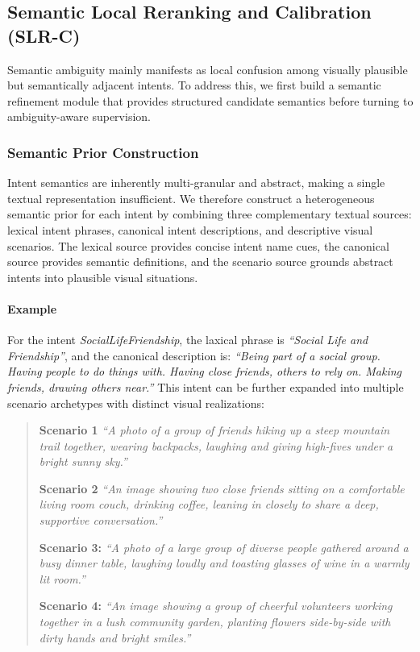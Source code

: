 \subsection{Semantic Local Reranking and Calibration (SLR-C)}

Semantic ambiguity mainly manifests as local confusion among visually plausible but semantically adjacent intents. To address this, we first build a semantic refinement module that provides structured candidate semantics before turning to ambiguity-aware supervision.

\subsubsection{Semantic Prior Construction}

Intent semantics are inherently multi-granular and abstract, making a single textual representation insufficient. We therefore construct a heterogeneous semantic prior for each intent by combining three complementary textual sources: lexical intent phrases, canonical intent descriptions, and descriptive visual scenarios. The lexical source provides concise intent name cues, the canonical source provides semantic definitions, and the scenario source grounds abstract intents into plausible visual situations.


\paragraph{Example}
For the intent \textit{SocialLifeFriendship}, the laxical phrase is \textit{``Social Life and Friendship''}, and the canonical description is:
\textit{``Being part of a social group. Having people to do things with. Having close friends, others to rely on. Making friends, drawing others near.''}
This intent can be further expanded into multiple scenario archetypes with distinct visual realizations:
\begin{quote}
\small
\textbf{Scenario 1}
\textit{``A photo of a group of friends hiking up a steep mountain trail together, wearing backpacks, laughing and giving high-fives under a bright sunny sky.''}

\textbf{Scenario 2}
\textit{``An image showing two close friends sitting on a comfortable living room couch, drinking coffee, leaning in closely to share a deep, supportive conversation.''}

\textbf{Scenario 3:}
\textit{``A photo of a large group of diverse people gathered around a busy dinner table, laughing loudly and toasting glasses of wine in a warmly lit room.''}

\textbf{Scenario 4:}
\textit{``An image showing a group of cheerful volunteers working together in a lush community garden, planting flowers side-by-side with dirty hands and bright smiles.''}
\end{quote}

